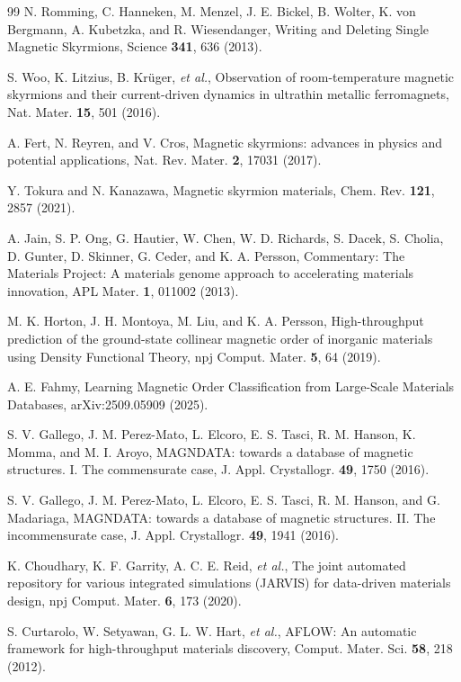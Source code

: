 \documentclass[aps,prb,preprint,superscriptaddress,longbibliography,nofootinbib]{revtex4-2}
\begin{document}
\begin{thebibliography}{99}
 N. Romming, C. Hanneken, M. Menzel, J. E. Bickel, B. Wolter, K. von Bergmann, A. Kubetzka, and R. Wiesendanger, Writing and Deleting Single Magnetic Skyrmions, Science \textbf{341}, 636 (2013).

 S. Woo, K. Litzius, B. Kr\"uger, \emph{et al.}, Observation of room-temperature magnetic skyrmions and their current-driven dynamics in ultrathin metallic ferromagnets, Nat. Mater. \textbf{15}, 501 (2016).

 A. Fert, N. Reyren, and V. Cros, Magnetic skyrmions: advances in physics and potential applications, Nat. Rev. Mater. \textbf{2}, 17031 (2017).

 Y. Tokura and N. Kanazawa, Magnetic skyrmion materials, Chem. Rev. \textbf{121}, 2857 (2021).

 A. Jain, S. P. Ong, G. Hautier, W. Chen, W. D. Richards, S. Dacek, S. Cholia, D. Gunter,
D. Skinner, G. Ceder, and K. A. Persson, Commentary: The Materials Project: A materials genome approach to
accelerating materials innovation, APL Mater. \textbf{1}, 011002 (2013).

 M. K. Horton, J. H. Montoya, M. Liu, and K. A. Persson, High-throughput prediction of
the ground-state collinear magnetic order of inorganic materials using Density Functional Theory, npj
Comput. Mater. \textbf{5}, 64 (2019).

 A. E. Fahmy, Learning Magnetic Order Classification from Large-Scale Materials
Databases, arXiv:2509.05909 (2025).

 S. V. Gallego, J. M. Perez-Mato, L. Elcoro, E. S. Tasci, R. M. Hanson, K. Momma, and
M. I. Aroyo, MAGNDATA: towards a database of magnetic structures. I. The commensurate case, J. Appl.
Crystallogr. \textbf{49}, 1750 (2016).

 S. V. Gallego, J. M. Perez-Mato, L. Elcoro, E. S. Tasci, R. M. Hanson, and G.
Madariaga, MAGNDATA: towards a database of magnetic structures. II. The incommensurate case, J. Appl.
Crystallogr. \textbf{49}, 1941 (2016).

 K. Choudhary, K. F. Garrity, A. C. E. Reid, \emph{et al.}, The joint automated repository for various integrated simulations (JARVIS) for data-driven materials design, npj Comput. Mater. \textbf{6}, 173 (2020).

 S. Curtarolo, W. Setyawan, G. L. W. Hart, \emph{et al.}, AFLOW: An automatic framework for high-throughput materials discovery, Comput. Mater. Sci. \textbf{58}, 218 (2012).


\end{thebibliography}
\end{document}
